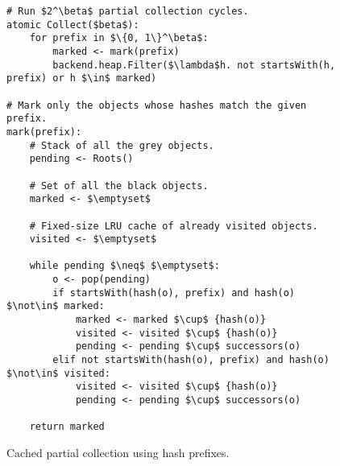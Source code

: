 \begin{figure}[!ht]
  \caption{Cached partial collection using hash prefixes.}
  \label{alg:partial-prefix-lru}

  \centering
  \begin{lstlisting}
# Run $2^\beta$ partial collection cycles.
atomic Collect($beta$):
    for prefix in $\{0, 1\}^\beta$:
        marked <- mark(prefix)
        backend.heap.Filter($\lambda$h. not startsWith(h, prefix) or h $\in$ marked)

# Mark only the objects whose hashes match the given prefix.
mark(prefix):
    # Stack of all the grey objects.
    pending <- Roots()

    # Set of all the black objects.
    marked <- $\emptyset$

    # Fixed-size LRU cache of already visited objects.
    visited <- $\emptyset$

    while pending $\neq$ $\emptyset$:
        o <- pop(pending)
        if startsWith(hash(o), prefix) and hash(o) $\not\in$ marked:
            marked <- marked $\cup$ {hash(o)}
            visited <- visited $\cup$ {hash(o)}
            pending <- pending $\cup$ successors(o)
        elif not startsWith(hash(o), prefix) and hash(o) $\not\in$ visited:
            visited <- visited $\cup$ {hash(o)}
            pending <- pending $\cup$ successors(o)

    return marked
\end{lstlisting}
\end{figure}
